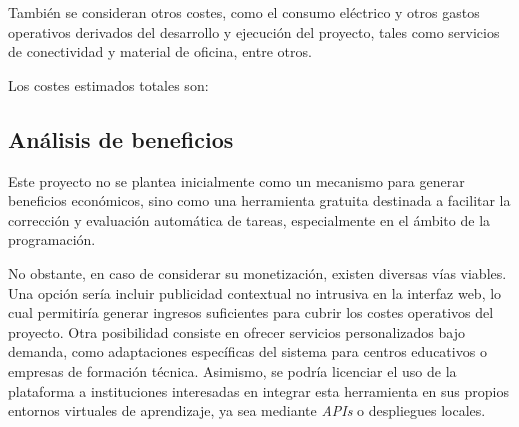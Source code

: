 También se consideran otros costes, como el consumo eléctrico y otros gastos operativos derivados del desarrollo y ejecución del proyecto, 
tales como servicios de conectividad y material de oficina, entre otros.


Los costes estimados totales son:


\subsection{Análisis de beneficios}

Este proyecto no se plantea inicialmente como un mecanismo para generar beneficios económicos, sino como una herramienta gratuita destinada 
a facilitar la corrección y evaluación automática de tareas, especialmente en el ámbito de la programación.

No obstante, en caso de considerar su monetización, existen diversas vías viables. 
Una opción sería incluir publicidad contextual no intrusiva en la interfaz web, lo cual permitiría generar 
ingresos suficientes para cubrir los costes operativos del proyecto. Otra posibilidad consiste en ofrecer 
servicios personalizados bajo demanda, como adaptaciones específicas del sistema para centros educativos o 
empresas de formación técnica. Asimismo, se podría licenciar el uso de la plataforma a instituciones interesadas 
en integrar esta herramienta en sus propios entornos virtuales de aprendizaje, ya sea mediante \textit{APIs} o despliegues locales.

